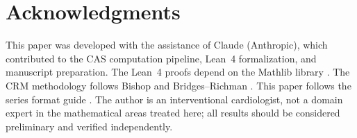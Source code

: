 \documentclass[11pt,a4paper]{article}
\theoremstyle{definition}
\theoremstyle{remark}
\begin{document}
\section*{Acknowledgments}

This paper was developed with the assistance of Claude (Anthropic),
which contributed to the CAS computation pipeline, Lean~4 formalization,
and manuscript preparation.
The Lean~4 proofs depend on the Mathlib library \cite{Mathlib2020}.
The CRM methodology follows Bishop \cite{Bishop1967} and
Bridges--Richman \cite{BridgesRichman1987}.
This paper follows the series format guide \cite{CRMFormatGuide}.
The author is an interventional cardiologist, not a domain expert in the mathematical areas treated here; all results should be considered preliminary and verified independently.
\end{document}
